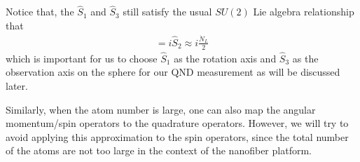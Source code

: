 Notice that, the $ \hat{S}_1 $ and $ \hat{S}_3 $ still satisfy the usual $ SU(2) $ Lie algebra relationship that 
\begin{align}
[\hat{S}_3,\hat{S}_1] = i \hat{S}_2 \approx i\frac{\dot{N}_L}{2}
\end{align}
which is important for us to choose $ \hat{S}_1 $ as the rotation axis and $ \hat{S}_3 $ as the observation axis on the \Poincare sphere for our QND measurement as will be discussed later. 



Similarly, when the atom number is large, one can also map the angular momentum/spin operators to the quadrature operators. However, we will try to avoid applying this approximation to the spin operators, since the total number of the atoms are not too large in the context of the nanofiber platform. 



